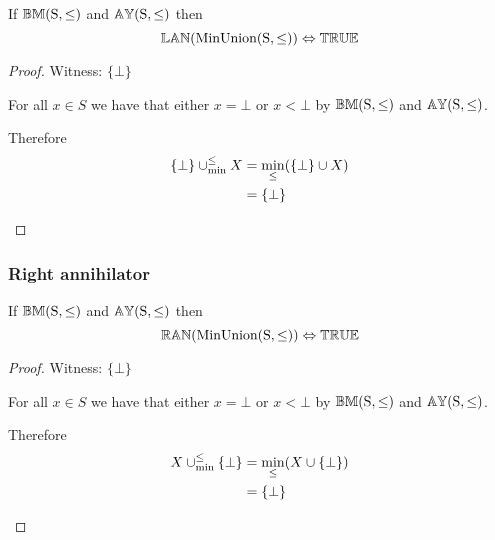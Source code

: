 \documentclass[../Summary.tex]{subfiles}
\begin{document}
\begin{theorem} \label{thm:minunion_lan}
If ${\mathbb{BM}}(\mathrm{S,\leq})$ and ${\mathbb{AY}}(\mathrm{S,\leq})$ then
\begin{equation*}
{\mathbb{LAN}}(\mathrm{MinUnion(S,\leq)}) \Leftrightarrow {\mathbb{TRUE}}
\end{equation*}
\end{theorem}

\begin{proof}

\vspace{0.5em}

Witness: $\{\bot\}$
\begin{ind}
For all $x \in S$ we have that either $x = \bot$ or $x < \bot$ by ${\mathbb{BM}}(\mathrm{S,\leq})$ and ${\mathbb{AY}}(\mathrm{S,\leq})$.

\vspace{0.5em}

Therefore
\begin{align*}
\{\bot\} \mathbin{\cup_{\min}^{\leq}} X 	& = \min_\leq(\{\bot\} \cup X) \\
						& = \{\bot\}
\end{align*}
\end{ind}
\end{proof}





\subsubsection{Right annihilator}

\begin{theorem} \label{thm:minunion_ran}
If ${\mathbb{BM}}(\mathrm{S,\leq})$ and ${\mathbb{AY}}(\mathrm{S,\leq})$ then
\begin{equation*}
{\mathbb{RAN}}(\mathrm{MinUnion(S,\leq)}) \Leftrightarrow {\mathbb{TRUE}}
\end{equation*}
\end{theorem}

\begin{proof}

\vspace{0.5em}

Witness: $\{\bot\}$
\begin{ind}
For all $x \in S$ we have that either $x = \bot$ or $x < \bot$ by ${\mathbb{BM}}(\mathrm{S,\leq})$ and ${\mathbb{AY}}(\mathrm{S,\leq})$.

\vspace{0.5em}

Therefore
\begin{align*}
X \mathbin{\cup_{\min}^{\leq}} \{\bot\} 	& = \min_\leq(X \cup \{\bot\}) \\
						& = \{\bot\}
\end{align*}
\end{ind}
\end{proof}
\end{document}
